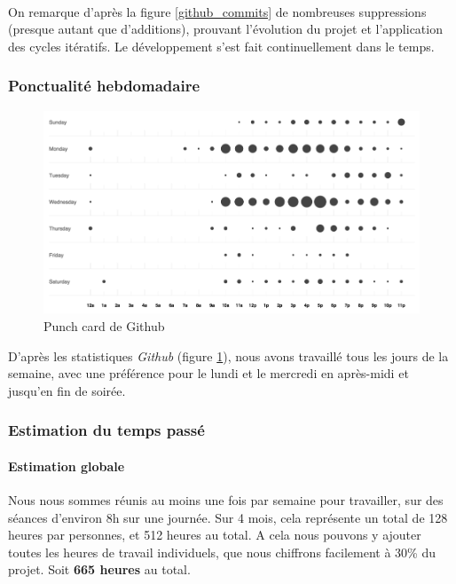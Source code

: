 \paragraph{}
On remarque d'après la figure \ref{github_commits} de nombreuses suppressions (presque autant que d’additions), prouvant l’évolution du projet et l’application des cycles itératifs. Le développement s’est fait continuellement dans le temps.

\subsubsection{Ponctualité hebdomadaire}

\begin{figure}[H]\centering
  \includegraphics[scale=.8]{./img/punchcard.png}
  \caption{Punch card de Github}
  \label{punchcard}
\end{figure}

D’après les statistiques \emph{Github} (figure \ref{punchcard}), nous avons travaillé tous les jours de la semaine, avec une préférence pour le lundi et le mercredi en après-midi et jusqu’en fin de soirée.

\subsubsection{Estimation du temps passé}

\paragraph{Estimation globale}
Nous nous sommes réunis au moins une fois par semaine pour travailler, sur des séances d'environ 8h sur une journée. Sur 4 mois, cela représente un total de 128 heures par personnes, et 512 heures au total. A cela nous pouvons y ajouter toutes les heures de travail individuels, que nous chiffrons facilement à 30\% du projet. Soit \textbf{665 heures} au total.

